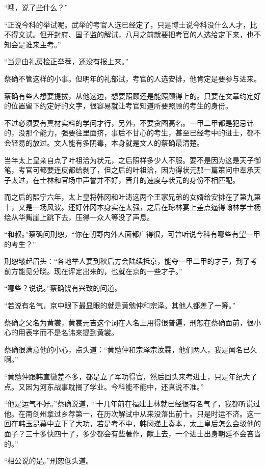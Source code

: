 “哦，说了些什么？”

“正说今科的举试呢。武举的考官人选已经定了，只是博士说今科没什么人才，比不得文试。但开封府、国子监的解试，八月之前就要把考官的人选给定下来，也不知会是谁来主考。”

“当是由礼房检正举荐，还没有报上来。”

蔡确不管这样的小事。但明年的礼部试，考官的人选安排，他肯定是要参与进来。

蔡确有些人想要提拔，从他这边，想要照顾还是能照顾得上的。只要在文章约定好的位置留下约定好的文字，很容易就让考官知道所要照顾的考生的身份。

不过必须要有真材实料的学问才行，另外，不要贪图高名。一甲二甲都是犯忌讳的，没那个能力，强要往里面挤，事后不甘心的考生，甚至已经考中的进士，都不会轻易的放过。文人能有多阴毒，本身就是文人的蔡确最清楚。

当年太上皇亲自点了叶祖洽为状元，之后照样多少人不服。要不是因为这是天子御笔，考官可都要连皮都给剥了，但之后的叶祖洽，因为得状元那一篇策问中奉承天子太过，在士林和官场中声誉并不好，晋升的速度与状元的身份不相匹配。

而之后的熙宁六年，太上皇将韩冈和叶涛这两个王家兄弟的女婿给安排在了第九第十，又是一场风波。还好韩冈本身实在太强，之后在琼林宴上差点逼得翰林学士杨绘从华觜崖上跳下去，压得一众人等没了声息。

“和叔。”蔡确问刑恕，“你在朝野内外人面都广得很，可曾听说今科有哪些有望一甲的考生？”

刑恕皱起眉头：“各地举人要到秋后方会陆续抵京，能夺一甲二甲的才子，到了考前方能见分晓。现在评定出来的，也就在京的一些才子。”

“哪些？说说。”蔡确饶有兴致的问道。

“若说有名气，京中眼下最显眼的就是黄勉仲和宗泽。其他人都差了一筹。”

蔡确之父名为黄裳，黄裳元吉这个词在人名上用得很普遍，刑恕在蔡确面前，很小心的用表字而不是名讳来提到黄裳。

蔡确很满意他的小心，点头道：“黄勉仲和宗泽宗汝霖，他们两人，我是闻名已久啊。”

“黄勉仲跟韩宣徽差不多，都是立了军功得官，然后回头来考进士，只是年纪大了点。又因为河东战事耽搁了学业。今科能不能中，还真说不准。”

“他是运气不好。”蔡确说道，“十几年前在福建士林就已经很有名气了，我都听说过他。在南剑州拿过乡荐第一，在历次解试中从来没落出前十。只是时运不济。这一回在韩玉昆幕中立下了大功，若是考不中，韩冈递上奏本，太上皇后怎么会驳他的面子？三十多快四十了，多少都会有些著作，献上去，一个进士出身朝廷不会吝啬的。”

“相公说的是。”刑恕低头道。

